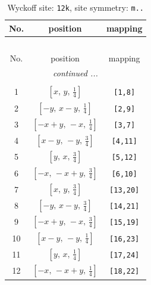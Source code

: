 \documentclass[fleqn,8pt]{jsarticle}
\begin{document}
\begin{longtable}{ccc}
\caption{Wyckoff site: {\tt 12k}, site symmetry: {\tt m..}}
 \\
 \hline \hline
No. & position & mapping \\ \hline \endfirsthead

\multicolumn{2}{l}{\tablename\ \thetable{}} \\
 \hline \hline
No. & position & mapping \\ \hline \endhead

 \hline \hline
\multicolumn{2}{r}{\footnotesize\it continued ...} \\ \endfoot

 \hline \hline
\multicolumn{2}{r}{} \\ \endlastfoot

1 & $\left[ x,\, y,\, \frac{1}{4} \right]$ & {\tt [1,8]} \\ \hline
2 & $\left[ - y,\, x - y,\, \frac{1}{4} \right]$ & {\tt [2,9]} \\ \hline
3 & $\left[ - x + y,\, - x,\, \frac{1}{4} \right]$ & {\tt [3,7]} \\ \hline
4 & $\left[ x - y,\, - y,\, \frac{3}{4} \right]$ & {\tt [4,11]} \\ \hline
5 & $\left[ y,\, x,\, \frac{3}{4} \right]$ & {\tt [5,12]} \\ \hline
6 & $\left[ - x,\, - x + y,\, \frac{3}{4} \right]$ & {\tt [6,10]} \\ \hline
7 & $\left[ x,\, y,\, \frac{3}{4} \right]$ & {\tt [13,20]} \\ \hline
8 & $\left[ - y,\, x - y,\, \frac{3}{4} \right]$ & {\tt [14,21]} \\ \hline
9 & $\left[ - x + y,\, - x,\, \frac{3}{4} \right]$ & {\tt [15,19]} \\ \hline
10 & $\left[ x - y,\, - y,\, \frac{1}{4} \right]$ & {\tt [16,23]} \\ \hline
11 & $\left[ y,\, x,\, \frac{1}{4} \right]$ & {\tt [17,24]} \\ \hline
12 & $\left[ - x,\, - x + y,\, \frac{1}{4} \right]$ & {\tt [18,22]} \\
\end{longtable}
\renewcommand{\arraystretch}{1.2}
\end{document}
